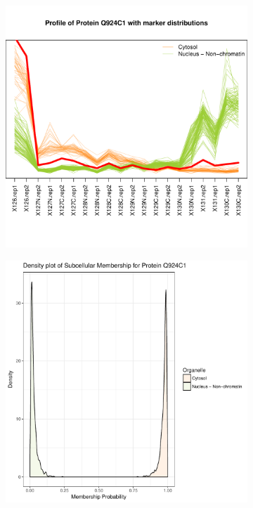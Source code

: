 \documentclass[12pt,english]{article}\usepackage[]{graphicx}\usepackage[]{color}
\makeatletter
\def\maxwidth{ %
  \ifdim\Gin@nat@width>\linewidth
    \linewidth
  \else
    \Gin@nat@width
  \fi
}
\newenvironment{knitrout}{}{} %
\makeatother
\begin{document}
\begin{figure}[h]
\begin{subfigure}[t]{0.5\textwidth}
\begin{knitrout}
{\centering \includegraphics[width=\maxwidth]{figure/unnamed-chunk-13-1} 

}



\end{knitrout}
    \caption{}
  \end{subfigure}
  \vspace{1cm}
  \begin{subfigure}[t]{0.5\textwidth}
    \centering
\begin{knitrout}
\color{fgcolor}

{\centering \includegraphics[width=\maxwidth]{figure/unnamed-chunk-14-1} 

}
\end{knitrout}
\end{subfigure}
\end{figure}
\end{document}
